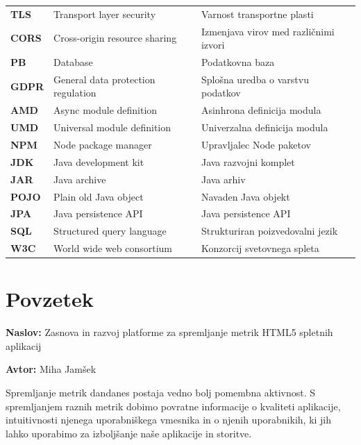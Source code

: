 \documentclass[a4paper, 12pt]{book}
\newcommand{\ttitle}{Zasnova in razvoj platforme za spremljanje metrik HTML5 spletnih aplikacij}
\newcommand{\tauthor}{Miha Jamšek}
\newcommand{\clearemptydoublepage}{\newpage{\pagestyle{empty}\cleardoublepage}}
\begin{document}
\noindent\begin{tabular}{p{}|p{}|p{}}    %
  {\bf TLS}   & Transport layer security  & Varnost transportne plasti \\
  {\bf CORS}   & Cross-origin resource sharing  & Izmenjava virov med različnimi izvori \\
  {\bf PB}   & Database    & Podatkovna baza \\
  {\bf GDPR}   & General data protection regulation  & Splošna uredba o varstvu podatkov  \\
  {\bf AMD}   & Async module definition   & Asinhrona definicija modula \\
  {\bf UMD}   & Universal module definition    & Univerzalna definicija modula \\
  {\bf NPM}   & Node package manager   & Upravljalec Node paketov \\
  {\bf JDK}   & Java development kit  & Java razvojni komplet \\
  {\bf JAR}   & Java archive  & Java arhiv \\
  {\bf POJO}   & Plain old Java object  & Navaden Java objekt \\
  {\bf JPA}   & Java persistence API    & Java persistence API \\
  {\bf SQL}   & Structured query language   & Strukturiran poizvedovalni jezik \\
  {\bf W3C}   & World wide web consortium    & Konzorcij svetovnega spleta \\
\end{tabular}



\clearemptydoublepage

\chapter*{Povzetek}


\noindent\textbf{Naslov:} \ttitle
\bigskip

\noindent\textbf{Avtor:} \tauthor
\bigskip

\noindent Spremljanje metrik dandanes postaja vedno bolj pomembna aktivnost. S spremljanjem raznih metrik  dobimo povratne informacije o kvaliteti aplikacije, intuitivnosti njenega uporabniškega vmesnika in o njenih uporabnikih, ki jih lahko uporabimo za izboljšanje naše aplikacije in storitve.
\end{document}
